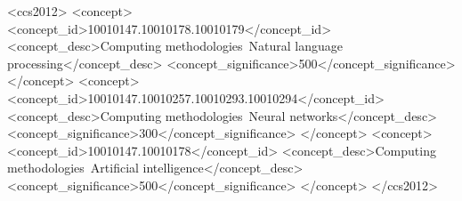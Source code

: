 \documentclass[sigconf,anonymous,review]{acmart}
\newcommand{\oa}{\texttt{optany}}
\newcommand{\asi}{SI}
\begin{document}


\begin{CCSXML}
<ccs2012>
 <concept>
  <concept_id>10010147.10010178.10010179</concept_id>
  <concept_desc>Computing methodologies~Natural language processing</concept_desc>
  <concept_significance>500</concept_significance>
 </concept>
 <concept>
  <concept_id>10010147.10010257.10010293.10010294</concept_id>
  <concept_desc>Computing methodologies~Neural networks</concept_desc>
  <concept_significance>300</concept_significance>
 </concept>
 <concept>
  <concept_id>10010147.10010178</concept_id>
  <concept_desc>Computing methodologies~Artificial intelligence</concept_desc>
  <concept_significance>500</concept_significance>
 </concept>
</ccs2012>
\end{CCSXML}
\end{document}
